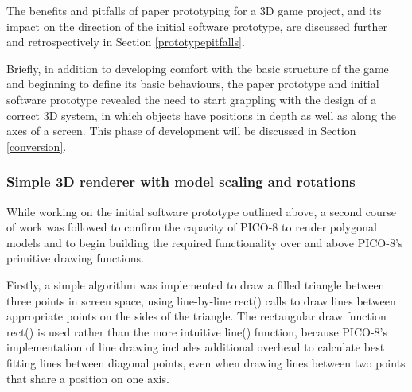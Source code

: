 \documentclass[11pt]{article}
\begin{document}

The benefits and pitfalls of paper prototyping for a 3D game project, and its impact on the
direction of the initial software prototype, are discussed further and retrospectively in
Section \ref{prototypepitfalls}.

Briefly, in addition to developing comfort with the basic structure of the game and beginning
to define its basic behaviours, the paper prototype and initial software prototype revealed the
need to start grappling with the design of a correct 3D system, in which objects have positions
in depth as well as along the axes of a screen. This phase of development will be discussed in
Section \ref{conversion}.

\subsubsection*{Simple 3D renderer with model scaling and rotations}\label{renderer}


While working on the initial software prototype outlined above, a second course of work
was followed to confirm the capacity of PICO-8 to render polygonal models and to begin
building the required functionality over and above PICO-8's primitive drawing functions.

Firstly, a simple algorithm was implemented to draw a filled triangle between three points
in screen space, using line-by-line rect() calls to draw lines between appropriate points on the
sides of the triangle. The rectangular draw function rect() is used
rather than the more intuitive line() function, because PICO-8's implementation of line drawing
includes additional overhead to calculate best fitting lines between diagonal points, even when
drawing lines between two points that share a position on one axis.
\end{document}
